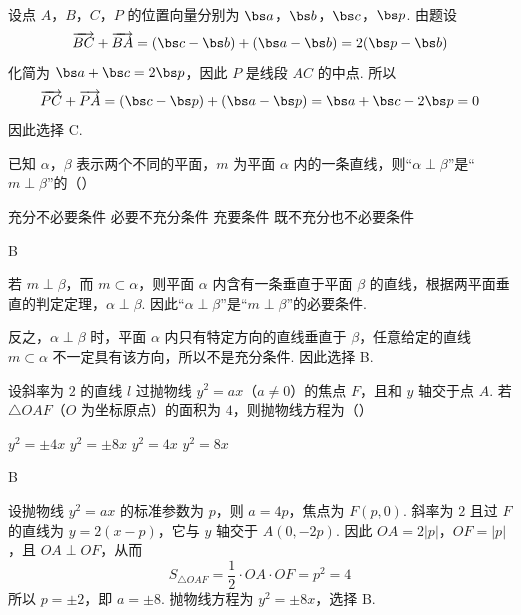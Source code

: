 \begin{solution}
设点 \(A\)，\(B\)，\(C\)，\(P\) 的位置向量分别为 \(\bs a\)，\(\bs b\)，\(\bs c\)，\(\bs p\). 由题设
\[
\overrightarrow{BC}+\overrightarrow{BA}=(\bs c-\bs b)+(\bs a-\bs b)=2(\bs p-\bs b)
\]
化简为 \(\bs a+\bs c=2\bs p\)，因此 \(P\) 是线段 \(AC\) 的中点. 所以
\[
\overrightarrow{PC}+\overrightarrow{PA}=(\bs c-\bs p)+(\bs a-\bs p)=\bs a+\bs c-2\bs p=0
\]
因此选择 C.
\end{solution}

\begin{problem}
已知 \(\alpha\)，\(\beta\) 表示两个不同的平面，\(m\) 为平面 \(\alpha\) 内的一条直线，则“\(\alpha \perp \beta\)”是“\(m \perp \beta\)”的（\quad）

\choices
    {充分不必要条件}
    {必要不充分条件}
    {充要条件}
    {既不充分也不必要条件}
\end{problem}

\begin{answer}
B
\end{answer}

\begin{solution}
若 \(m\perp\beta\)，而 \(m\subset\alpha\)，则平面 \(\alpha\) 内含有一条垂直于平面 \(\beta\) 的直线，根据两平面垂直的判定定理，\(\alpha\perp\beta\). 因此“\(\alpha\perp\beta\)”是“\(m\perp\beta\)”的必要条件.

反之，\(\alpha\perp\beta\) 时，平面 \(\alpha\) 内只有特定方向的直线垂直于 \(\beta\)，任意给定的直线 \(m\subset\alpha\) 不一定具有该方向，所以不是充分条件. 因此选择 B.
\end{solution}

\begin{problem}
设斜率为 \(2\) 的直线 \(l\) 过抛物线 \( y^{2} = ax \)（\(a \neq 0\)）的焦点 \(F\)，且和 \(y\) 轴交于点 \(A\). 若 \( \triangle OAF \)（\(O\) 为坐标原点）的面积为 \(4\)，则抛物线方程为（\quad）

\choices
    {\( y^{2} = \pm 4x \)}
    {\( y^{2} = \pm 8x \)}
    {\( y^{2} = 4x \)}
    {\( y^{2} = 8x \)}
\end{problem}

\begin{answer}
B
\end{answer}

\begin{solution}
设抛物线 \(y^2=ax\) 的标准参数为 \(p\)，则 \(a=4p\)，焦点为 \(F(p,0)\). 斜率为 \(2\) 且过 \(F\) 的直线为 \(y=2(x-p)\)，它与 \(y\) 轴交于 \(A(0,-2p)\). 因此 \(OA=2\lvert p\rvert\)，\(OF=\lvert p\rvert\)，且 \(OA\perp OF\)，从而
\[
S_{\triangle OAF}=\frac12\cdot OA\cdot OF=p^2=4
\]
所以 \(p=\pm2\)，即 \(a=\pm8\). 抛物线方程为 \(y^2=\pm8x\)，选择 B.
\end{solution}

